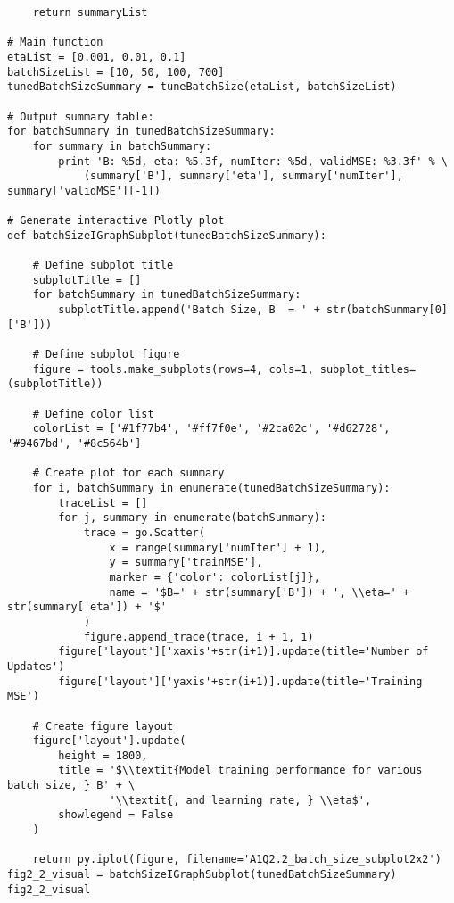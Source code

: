 \documentclass[a4paper,12pt]{article}
\begin{document}
\begin{verbatim}
    return summaryList
    
# Main function
etaList = [0.001, 0.01, 0.1]
batchSizeList = [10, 50, 100, 700]
tunedBatchSizeSummary = tuneBatchSize(etaList, batchSizeList)

# Output summary table:
for batchSummary in tunedBatchSizeSummary:
    for summary in batchSummary:
        print 'B: %5d, eta: %5.3f, numIter: %5d, validMSE: %3.3f' % \
            (summary['B'], summary['eta'], summary['numIter'], summary['validMSE'][-1])

# Generate interactive Plotly plot
def batchSizeIGraphSubplot(tunedBatchSizeSummary):
    
    # Define subplot title
    subplotTitle = []
    for batchSummary in tunedBatchSizeSummary:
        subplotTitle.append('Batch Size, B  = ' + str(batchSummary[0]['B']))
    
    # Define subplot figure
    figure = tools.make_subplots(rows=4, cols=1, subplot_titles=(subplotTitle))
    
    # Define color list
    colorList = ['#1f77b4', '#ff7f0e', '#2ca02c', '#d62728', '#9467bd', '#8c564b']
    
    # Create plot for each summary
    for i, batchSummary in enumerate(tunedBatchSizeSummary):
        traceList = []
        for j, summary in enumerate(batchSummary):
            trace = go.Scatter(
                x = range(summary['numIter'] + 1),
                y = summary['trainMSE'],
                marker = {'color': colorList[j]},
                name = '$B=' + str(summary['B']) + ', \\eta=' + str(summary['eta']) + '$'
            )
            figure.append_trace(trace, i + 1, 1)
        figure['layout']['xaxis'+str(i+1)].update(title='Number of Updates')
        figure['layout']['yaxis'+str(i+1)].update(title='Training MSE')

    # Create figure layout
    figure['layout'].update(
        height = 1800,
        title = '$\\textit{Model training performance for various batch size, } B' + \
                '\\textit{, and learning rate, } \\eta$',
        showlegend = False
    )

    return py.iplot(figure, filename='A1Q2.2_batch_size_subplot2x2')
fig2_2_visual = batchSizeIGraphSubplot(tunedBatchSizeSummary)
fig2_2_visual
\end{verbatim}
\end{document}
